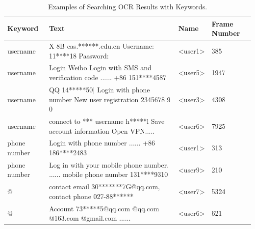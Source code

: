 \begin{table}[t]
	\centering
	\begin{tabular}{|l|l|l|l|}
		\hline
		\textbf{Keyword} & \textbf{Text}                                                             & \textbf{Name}                                   & \textbf{Frame Number} \\ \hline
		username                          & X 8B cas.******.edu.cn Username: 11****18 Password:                                        & \textless{}user1\textgreater{} & 385                                    \\ \hline
		username                          & Login Weibo Login with SMS and verification code ...... +86 151****4587                    & \textless{}user5\textgreater{} & 1947                                   \\ \hline
		username                          & QQ 14*****50| Login with phone number New user registration 2345678 9 0                    & \textless{}user3\textgreater{} & 4308                                   \\ \hline
		username                          & connect to *** username h*****l Save account information Open VPN.....                     & \textless{}user6\textgreater{} & 7925                                   \\ \hline
		phone number                      & Login with phone number ...... +86 186****2483 |                                           & \textless{}user1\textgreater{} & 313                                    \\ \hline
		phone number                      & Log in with your mobile phone number. ...... mobile phone number 131****9310 & \textless{}user9\textgreater{} & 210                                    \\ \hline
		@                                 & contact email 30*******7G@qq.com, contact phone 027-88******                               & \textless{}user7\textgreater{} & 5324                                   \\ \hline
		@                                 & Account 73*****5@qq.com @qq.com @163.com @gmail.com 	......      & \textless{}user6\textgreater{} & 621                                    \\ \hline
	\end{tabular}
	\linebreak
	\caption{Examples of Searching OCR Results with Keywords.}
	\label{tab:ocr_keyword_example}
\end{table}


